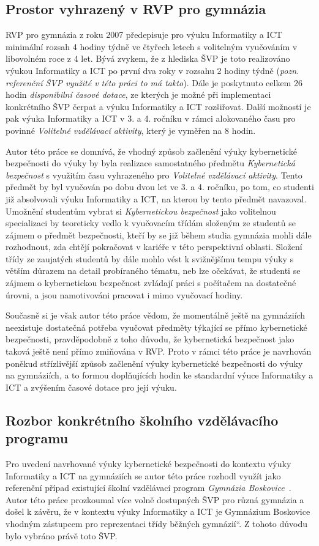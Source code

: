 \documentclass[a4paper, 12pt]{article}
\providecommand{\uv}[1]{\quotedblbase #1\textquotedblleft}
\begin{document}
\subsection{Prostor vyhrazený v RVP pro gymnázia}
RVP pro gymnázia z roku 2007 předepisuje pro výuku Informatiky a ICT  minimální rozsah 4 hodiny týdně ve čtyřech letech s volitelným vyučováním v libovolném roce z 4 let. Bývá zvykem, že z hlediska ŠVP je toto realizováno výukou Informatiky a ICT po první dva roky v rozsahu 2 hodiny týdně (\textit{pozn. referenční ŠVP využité v této práci to má takto}). Dále je poskytnuto celkem 26 hodin \textit{disponibilní časové dotace}, ze kterých je možné při implementaci konkrétního ŠVP čerpat a výuku Informatiky a ICT rozšiřovat. Další možností je pak výuka Informatiky a ICT v 3. a 4. ročníku v rámci alokovaného času pro povinné \textit{Volitelné vzdělávací aktivity}, který je vyměřen na 8 hodin.

Autor této práce se domnívá, že vhodný způsob začlenění výuky kybernetické bezpečnosti do výuky by byla realizace samostatného předmětu \textit{Kybernetická bezpečnost} s využitím času vyhrazeného pro \textit{Volitelné vzdělávací aktivity}. Tento předmět by byl vyučován po dobu dvou let ve 3. a 4. ročníku, po tom, co studenti již absolvovali výuku Informatiky a ICT, na kterou by tento předmět navazoval. Umožnění studentům vybrat si \textit{Kybernetickou bezpečnost} jako volitelnou specializaci by teoreticky vedlo k vyučovacím třídám složeným ze studentů se zájmem o předmět bezpečnosti, kteří by se již během studia gymnázia mohli dále rozhodnout, zda chtějí pokračovat v kariéře v této perspektivní oblasti. Složení třídy ze zaujatých studentů by dále mohlo vést k svižnějšímu tempu výuky s větším důrazem na detail probíraného tématu, neb lze očekávat, že studenti se zájmem o kybernetickou bezpečnost zvládají práci s počítačem na dostatečné 
úrovni, a jsou namotivováni pracovat i mimo vyučovací hodiny.

Současně si je však autor této práce vědom, že momentálně ještě na gymnáziích neexistuje dostatečná potřeba vyučovat předměty týkající se přímo kybernetické bezpečnosti, pravděpodobně z toho důvodu, že kybernetická bezpečnost jako taková ještě není přímo zmiňována v RVP. Proto v rámci této práce je navrhován poněkud střízlivější způsob začlenění výuky kybernetické bezpečnosti do výuky na gymnáziích, a to formou doplňujících hodin ke standardní výuce Informatiky a ICT a zvýšením časové dotace pro její výuku.

\subsection{Rozbor konkrétního školního vzdělávacího programu}
Pro uvedení navrhované výuky kybernetické bezpečnosti do kontextu výuky Informatiky a ICT na gymnáziích se autor této práce rozhodl využít jako referenční případ existující školní vzdělávací program \textit{Gymnázia Boskovice}~\cite{svpGymbos}. Autor této práce prozkoumal více volně dostupných ŠVP pro různá gymnázia a došel k závěru, že v kontextu výuky Informatiky a ICT je Gymnázium Boskovice vhodným zástupcem pro reprezentaci třídy \uv{běžných gymnázií}. Z tohoto důvodu bylo vybráno právě toto ŠVP.
\end{document}
